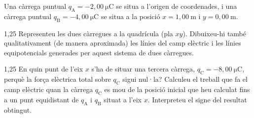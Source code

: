 Una càrrega puntual $q_\mathrm{A} = -2,00\ \mathrm{\mu C}$ se situa a l'origen de coordenades, i una càrrega puntual $q_\mathrm{B} = -4,00\ \mathrm{\mu C}$ se situa a la posició $x = 1,00\ \mathrm{m}$ i $y = 0,00\ \mathrm{m}$.

\begin{apartat}{1,25}
Representeu les dues càrregues a la quadrícula (pla $xy$). Dibuixeu-hi també qualitativament (de manera aproximada) les línies del camp elèctric i les línies equipotencials generades per aquest sistema de dues càrregues.
\end{apartat}

\begin{apartat}{1,25}
En quin punt de l'eix $x$ s'ha de situar una tercera càrrega, $q_\mathrm{C} = -8,00\ \mathrm{\mu C}$, perquè la força elèctrica total sobre $q_\mathrm{C}$ sigui nul·la? Calculeu el treball que fa el camp elèctric quan la càrrega $q_\mathrm{C}$ es mou de la posició inicial que heu calculat fins a un punt equidistant de $q_\mathrm{A}$ i $q_\mathrm{B}$ situat a l'eix $x$. Interpreteu el signe del resultat obtingut.
\end{apartat}


